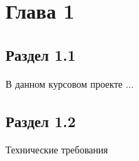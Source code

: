 \chapter[Глава 1]
{Глава 1}

\section{Раздел 1.1}\par
\hspace*{12.5 mm}В данном курсовом проекте ...

\section{Раздел 1.2}\par
\hspace*{12.5 mm}Технические требования 